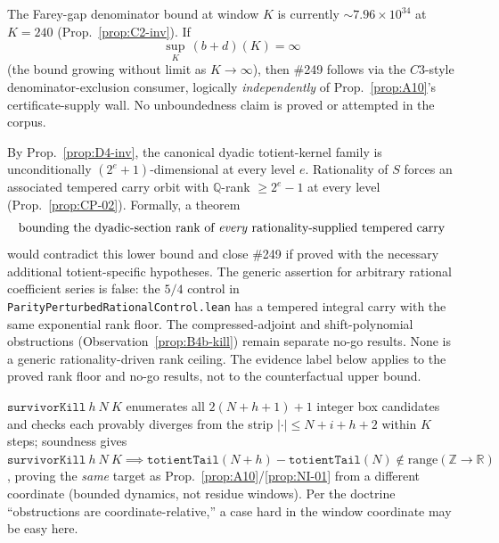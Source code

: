 \begin{prop}\label{prop:C2sup}
The Farey-gap denominator bound at window $K$ is currently $\sim 7.96\times10^{34}$ at $K=240$
(Prop.~\ref{prop:C2-inv}). If
\[
\sup_K\, (b+d)(K) = \infty
\]
(the bound growing without limit as $K\to\infty$), then \#249 follows via the $C3$-style
denominator-exclusion consumer, logically \emph{independently} of Prop.~\ref{prop:A10}'s
certificate-supply wall. No unboundedness claim is proved or attempted in the corpus.
\ \ \\
\end{prop}

\begin{prop}\label{prop:D5cons}
By Prop.~\ref{prop:D4-inv}, the canonical dyadic totient-kernel family is unconditionally
$(2^e+1)$-dimensional at every level $e$. Rationality of $S$ forces an associated tempered
carry orbit with $\mathbb Q$-rank $\ge 2^e-1$ at every level (Prop.~\ref{prop:CP-02}). Formally, a theorem
\[
\text{bounding the dyadic-section rank of \emph{every} rationality-supplied tempered carry}
\]
would contradict this lower bound and close \#249 if proved with the
necessary additional totient-specific hypotheses. The generic assertion
for arbitrary rational coefficient series is false: the $5/4$ control in
\texttt{ParityPerturbedRationalControl.lean} has a tempered integral carry
with the same exponential rank floor. The compressed-adjoint and
shift-polynomial obstructions (Observation~\ref{prop:B4b-kill}) remain
separate no-go results. None is a generic rationality-driven rank ceiling.
The evidence label below applies to the proved rank floor and no-go results,
not to the counterfactual upper bound.
\ \ \\
\end{prop}

\begin{prop}\label{prop:B12cons}
$\mathtt{survivorKill}\ h\ N\ K$ enumerates all $2(N+h+1)+1$ integer box candidates and checks
each provably diverges from the strip $|\cdot|\le N+i+h+2$ within $K$ steps; soundness gives
$\mathtt{survivorKill}\ h\ N\ K \implies \mathtt{totientTail}(N+h)-\mathtt{totientTail}(N)\notin\mathrm{range}(\mathbb Z\to\mathbb R)$,
proving the \emph{same} target as Prop.~\ref{prop:A10}/\ref{prop:NI-01} from a different
coordinate (bounded dynamics, not residue windows). Per the doctrine ``obstructions are
coordinate-relative,'' a case hard in the window coordinate may be easy here.
\ \ \\
\end{prop}

